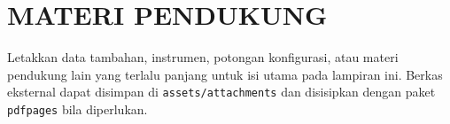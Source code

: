 \chapter{MATERI PENDUKUNG}
\label{app:materi-pendukung}

Letakkan data tambahan, instrumen, potongan konfigurasi, atau materi pendukung lain yang
terlalu panjang untuk isi utama pada lampiran ini. Berkas eksternal dapat disimpan di
\texttt{assets/attachments} dan disisipkan dengan paket \texttt{pdfpages} bila diperlukan.
